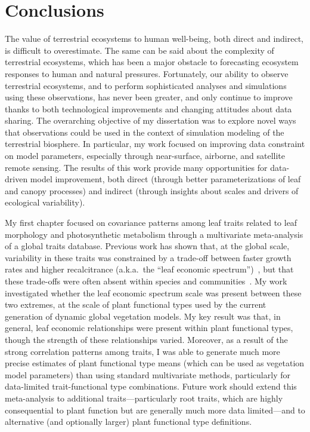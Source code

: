 \chapter{Conclusions}
\label{chapter:Conclusions}
\thispagestyle{myheadings}

The value of terrestrial ecosystems to human well-being, both direct and indirect, is difficult to overestimate.
The same can be said about the complexity of terrestrial ecosystems, which has been a major obstacle to forecasting ecosystem responses to human and natural pressures.
Fortunately, our ability to observe terrestrial ecosystems, and to perform sophisticated analyses and simulations using these observations, has never been greater, and only continue to improve thanks to both technological improvements and changing attitudes about data sharing.
The overarching objective of my dissertation was to explore novel ways that observations could be used in the context of simulation modeling of the terrestrial biosphere.
In particular, my work focused on improving data constraint on model parameters, especially through near-surface, airborne, and satellite remote sensing.
The results of this work provide many opportunities for data-driven model improvement, both direct (through better parameterizations of leaf and canopy processes) and indirect (through insights about scales and drivers of ecological variability). 

My first chapter focused on covariance patterns among leaf traits related to leaf morphology and photosynthetic metabolism through a multivariate meta-analysis of a global traits database.
Previous work has shown that, at the global scale, variability in these traits was constrained by a trade-off between faster growth rates and higher recalcitrance (a.k.a.\ the ``leaf economic spectrum'')~\cite{wright_worldwide_2004,diaz_global_2016},
but that these trade-offs were often absent within species and communities~\cite{albert_intraspecific_2010,messier_how_2010,wright_does_2012}.
My work investigated whether the leaf economic spectrum scale was present between these two extremes, at the scale of plant functional types used by the current generation of dynamic global vegetation models.
My key result was that, in general, leaf economic relationships were present within plant functional types, though the strength of these relationships varied.
Moreover, as a result of the strong correlation patterns among traits, I was able to generate much more precise estimates of plant functional type means (which can be used as vegetation model parameters) than using standard multivariate methods, particularly for data-limited trait-functional type combinations.
Future work should extend this meta-analysis to additional traits---particularly root traits, which are highly consequential to plant function but are generally much more data limited---and to alternative (and optionally larger) plant functional type definitions.

